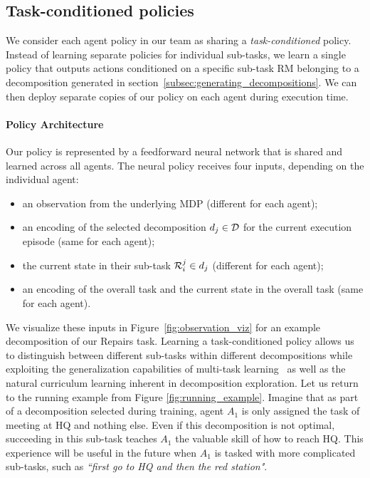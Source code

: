 \subsection{Task-conditioned policies}
\label{subsec:task_conditioned_setup}
We consider each agent policy in our team as sharing a \textit{task-conditioned} policy. Instead of learning separate policies for individual sub-tasks, we learn a single policy that outputs actions conditioned on a specific sub-task RM belonging to a decomposition generated in section~\ref{subsec:generating_decompositions}. We can then deploy separate copies of our policy on each agent during execution time.
\paragraph{Policy Architecture} Our policy is represented by a feedforward neural network that is shared and learned across all agents. The neural policy receives four inputs, depending on the individual agent:
\begin{itemize}
    \item an observation from the underlying MDP (different for each agent);
    \item an encoding of the selected decomposition $d_j \in \mathcal{D}$ for the current execution episode (same for each agent); 
    \item the current state in their sub-task $\mathcal{R}_{i}^{j} \in d_j$ (different for each agent);
    \item an encoding of the overall task and the current state in the overall task (same for each agent).
\end{itemize}

We visualize these inputs in Figure~\ref{fig:observation_viz} for an example decomposition of our Repairs task.
Learning a task-conditioned policy allows us to distinguish between different sub-tasks within different decompositions while exploiting the generalization capabilities of multi-task learning~\cite{qiu2023gcrlltl, vaezipoor2021ltl2action} as well as the natural curriculum learning inherent in decomposition exploration. Let us return to the running example from Figure \ref{fig:running_example}. Imagine that as part of a decomposition selected during training, agent $A_1$ is only assigned the task of meeting at HQ and nothing else. Even if this decomposition is not optimal, succeeding in this sub-task teaches $A_1$ the valuable skill of how to reach HQ. This experience will be useful in the future when $A_1$ is tasked with more complicated sub-tasks, such as \textit{``first go to HQ and then the red station"}.


